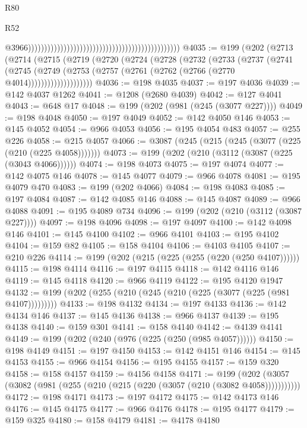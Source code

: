 \begin{lexlean}{R80}
\begin{lexlean}{R52}
\begin{coremodule}
{{{{{{{{{{{{{{{{{{{{{{{{{{{{{{{{{{{{{{{{{{{{{{{{{{{{{{{{{{{{{{{{{{{{{{{{{{{{{{{{{{{{{{{{{{{{{{{{{{{{{{{{{{{{{{{{{{{{{{{{{{{{{{{{{{{{{{{{{{{{{{{{{{{{{{{{{{{{{{{{{{{{{{{{{{{{{{{{{{{{{{{{{{{{{{{{{{{{{{                                                                                                  @3966)))))))))))))))))))))))))))))))))))))))))))))))
@4035 := @199
    (@202
      (@2713
        (@2714
          (@2715
            (@2719
              (@2720
                (@2724
                  (@2728
                    (@2732
                      (@2733
                        (@2737
                          (@2741
                            (@2745
                              (@2749
                                (@2753 (@2757 (@2761 (@2762 (@2766 (@2770 @4014))))))))))))))))))))
@4036 := @198 @4035
@4037 := @197 @4036
@4039 := @142 @4037 @1262
@4041 := @1208 (@2680 @4039)
@4042 := @127 @4041
@4043 := @648 @17
@4048 := @199 (@202 (@981 (@245 (@3077 @227))))
@4049 := @198 @4048
@4050 := @197 @4049
@4052 := @142 @4050 @146
@4053 := @145 @4052
@4054 := @966 @4053
@4056 := @195 @4054 @483
@4057 := @255 @226
@4058 := @215 @4057
@4066 := @3087 (@245 (@215 (@245 (@3077 (@225 (@210 (@225 @4058)))))))
@4073 := @199 (@202 (@210 (@3112 (@3087 (@225 (@3043 @4066))))))
@4074 := @198 @4073
@4075 := @197 @4074
@4077 := @142 @4075 @146
@4078 := @145 @4077
@4079 := @966 @4078
@4081 := @195 @4079 @470
@4083 := @199 (@202 @4066)
@4084 := @198 @4083
@4085 := @197 @4084
@4087 := @142 @4085 @146
@4088 := @145 @4087
@4089 := @966 @4088
@4091 := @195 @4089 @734
@4096 := @199 (@202 (@210 (@3112 (@3087 @227))))
@4097 := @198 @4096
@4098 := @197 @4097
@4100 := @142 @4098 @146
@4101 := @145 @4100
@4102 := @966 @4101
@4103 := @195 @4102
@4104 := @159 @82
@4105 := @158 @4104
@4106 := @4103 @4105
@4107 := @210 @226
@4114 := @199 (@202 (@215 (@225 (@255 (@220 (@250 @4107))))))
@4115 := @198 @4114
@4116 := @197 @4115
@4118 := @142 @4116 @146
@4119 := @145 @4118
@4120 := @966 @4119
@4122 := @195 @4120 @1947
@4132 := @199 (@202 (@255 (@210 (@245 (@210 (@225 (@3077 (@225 (@981 @4107)))))))))
@4133 := @198 @4132
@4134 := @197 @4133
@4136 := @142 @4134 @146
@4137 := @145 @4136
@4138 := @966 @4137
@4139 := @195 @4138
@4140 := @159 @301
@4141 := @158 @4140
@4142 := @4139 @4141
@4149 := @199 (@202 (@240 (@976 (@225 (@250 (@985 @4057))))))
@4150 := @198 @4149
@4151 := @197 @4150
@4153 := @142 @4151 @146
@4154 := @145 @4153
@4155 := @966 @4154
@4156 := @195 @4155
@4157 := @159 @320
@4158 := @158 @4157
@4159 := @4156 @4158
@4171 := @199 (@202 (@3057 (@3082 (@981 (@255 (@210 (@215 (@220 (@3057 (@210 (@3082 @4058)))))))))))
@4172 := @198 @4171
@4173 := @197 @4172
@4175 := @142 @4173 @146
@4176 := @145 @4175
@4177 := @966 @4176
@4178 := @195 @4177
@4179 := @159 @325
@4180 := @158 @4179
@4181 := @4178 @4180
}}}}}}}}}}}}}}}}}}}}}}}}}}}}}}}}}}}}}}}}}}}}}}}}}}}}}}}}}}}}}}}}}}}}}}}}}}}}}}}}}}}}}}}}}}}}}}}}}}}}}}}}}}}}}}}}}}}}}}}}}}}}}}}}}}}}}}}}}}}}}}}}}}}}}}}}}}}}}}}}}}}}}}}}}}}}}}}}}}}}}}}}}}}}}}}}}}}}}}
\end{coremodule}
\end{lexlean}
\end{lexlean}
